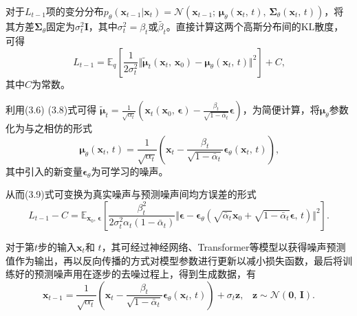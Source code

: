 对于$L_{t-1}$项的变分分布$p_{\theta}(\boldsymbol{x}_{t-1} \vert \boldsymbol{x}_t) = \mathcal{N} (\boldsymbol{x}_{t-1}\text{; } \boldsymbol{\mu}_{\theta} (\boldsymbol{x}_t\text{, } t) \text{, } \boldsymbol{\Sigma}_{\theta} (\boldsymbol{x}_t\text{, } t) )$，将其方差$\boldsymbol{\Sigma}_{\theta}$固定为$\sigma_t^2 \mathbf{I}$，其中$\sigma_t^2 =\beta_t $或$ \tilde{\beta_t}$。直接计算这两个高斯分布间的$\text{KL}$散度，可得
\begin{equation*}
L_{t-1}=\mathbb{E}_q \left[ \frac{1}{2\sigma_t^2} \Vert \tilde{\boldsymbol{\mu}}_t (\boldsymbol{x}_t\text{, } \boldsymbol{x}_0) -\boldsymbol{\mu}_{\theta} (\boldsymbol{x}_t\text{, } t) \Vert^2 \right] + C\text{,}
\tag{3.9}
\end{equation*}
\noindent 其中$C$为常数。

利用(3.6) (3.8)式可得 $\tilde{\boldsymbol{\mu}}_t=\frac{1}{\sqrt{\alpha_t}} \left( \boldsymbol{x}_t(\boldsymbol{x}_0\text{, }\boldsymbol{\epsilon})-\frac{\beta_t}{\sqrt{1-\bar{\alpha}_t}} \boldsymbol{\epsilon} \right)$，为简便计算，将$\boldsymbol{\mu}_{\theta}$参数化为与之相仿的形式
\begin{equation*}
\boldsymbol{\mu}_{\theta} (\boldsymbol{x}_t\text{, } t)=\frac{1}{\sqrt{\alpha_t}} \left( \boldsymbol{x}_t-\frac{\beta_t}{\sqrt{1-\bar{\alpha}_t}} \boldsymbol{\epsilon}_{\theta} (\boldsymbol{x}_t\text{, } t)\right)\text{,}
\tag{3.10}
\end{equation*}
\noindent 其中引入的新变量$\boldsymbol{\epsilon}_{\theta} $为可学习的噪声。

从而(3.9)式可变换为真实噪声与预测噪声间均方误差的形式
\begin{equation*}
L_{t-1}-C=\mathbb{E}_{\boldsymbol{x}_0\text{, } \boldsymbol{\epsilon}} \left[ \frac{\beta_t^2}{2\sigma_t^2 \alpha_t (1-\bar{\alpha}_t)} \Vert \boldsymbol{\epsilon} - \boldsymbol{\epsilon}_{\theta} (\sqrt{\bar{\alpha}_t} \boldsymbol{x}_0 +\sqrt{1-\bar{\alpha}_t } \boldsymbol{\epsilon}\text{, } t) \Vert^2 \right]\text{.}
\tag{3.11}
\end{equation*}

对于第$t$步的输入$\boldsymbol{x}_t$和 $t$，其可经过神经网络、Transformer等模型以获得噪声预测值作为输出，再以反向传播\cite{ref20}的方式对模型参数进行更新以减小损失函数，最后将训练好的预测噪声用在逐步的去噪过程上，得到生成数据，有
\begin{equation*}
\boldsymbol{x}_{t-1}=\frac{1}{\sqrt{\alpha_t}} \left( \boldsymbol{x}_t - \frac{\beta_t}{\sqrt{1-\bar{\alpha}_t}} \boldsymbol{\epsilon}_{\theta} (\boldsymbol{x}_t\text{, } t) \right) + \sigma_t \mathbf{z}\text{,}\quad \mathbf{z} \sim \mathcal{N} (\mathbf{0}\text{, } \mathbf{I})\text{.}
\tag{3.12}
\end{equation*}

